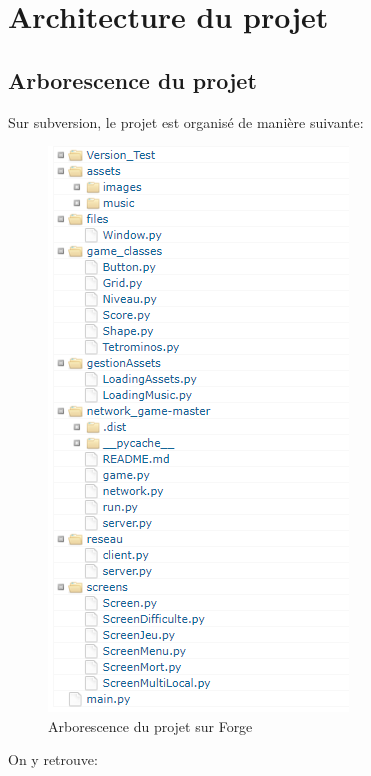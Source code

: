 \documentclass[a4paper, 11pt]{article}
\begin{document}
    \section{Architecture du projet}
        \subsection{Arborescence du projet}
            Sur subversion, le projet est organisé de manière suivante: 
            \begin{figure}[ht]
                \centering
                \includegraphics[scale=0.75]{images/arborescence.png}
                \caption{Arborescence du projet sur Forge}
            \end{figure}
            On y retrouve: 
\end{document}
